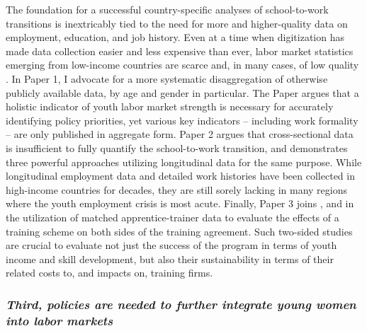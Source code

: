 \documentclass[
  a4paper, twoside, 12pt]{book}
\begin{document}
The foundation for a successful country-specific analyses of school-to-work transitions is inextricably tied to the need for more and higher-quality data on employment, education, and job history. Even at a time when digitization has made data collection easier and less expensive than ever, labor market statistics emerging from low-income countries are scarce and, in many cases, of low quality \autocite{fox2013}. In Paper 1, I advocate for a more systematic disaggregation of otherwise publicly available data, by age and gender in particular. The Paper argues that a holistic indicator of youth labor market strength is necessary for accurately identifying policy priorities, yet various key indicators -- including work formality -- are only published in aggregate form. Paper 2 argues that cross-sectional data is insufficient to fully quantify the school-to-work transition, and demonstrates three powerful approaches utilizing longitudinal data for the same purpose. While longitudinal employment data and detailed work histories have been collected in high-income countries for decades, they are still sorely lacking in many regions where the youth employment crisis is most acute. Finally, Paper 3 joins \textcite{crepon2019}, \textcite{alfonsi2020} and \textcite{hardy2022} in the utilization of matched apprentice-trainer data to evaluate the effects of a training scheme on both sides of the training agreement. Such two-sided studies are crucial to evaluate not just the success of the program in terms of youth income and skill development, but also their sustainability in terms of their related costs to, and impacts on, training firms.

\hypertarget{third-policies-are-needed-to-further-integrate-young-women-into-labor-markets}{%
\subsubsection*{\texorpdfstring{\emph{Third, policies are needed to further integrate young women into labor markets}}{Third, policies are needed to further integrate young women into labor markets}}\label{third-policies-are-needed-to-further-integrate-young-women-into-labor-markets}}
\end{document}
